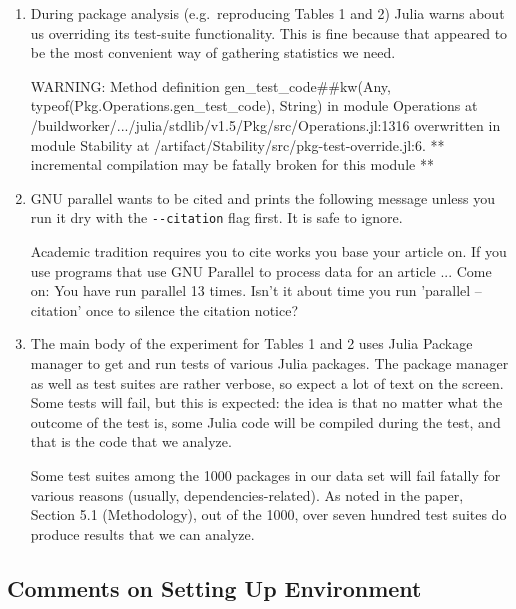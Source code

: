 \documentclass[
]{article}
\begin{document}
\begin{enumerate}
\def\labelenumi{\arabic{enumi}.}
\item
  During package analysis (e.g.~reproducing Tables 1 and 2) Julia warns
  about us overriding its test-suite functionality. This is fine because
  that appeared to be the most convenient way of gathering statistics we
  need.

\begin{verbnobox}[\small]
WARNING: Method definition gen_test_code##kw(Any, typeof(Pkg.Operations.gen_test_code), String)
  in module Operations at /buildworker/.../julia/stdlib/v1.5/Pkg/src/Operations.jl:1316
  overwritten in module Stability at /artifact/Stability/src/pkg-test-override.jl:6.
  ** incremental compilation may be fatally broken for this module **
\end{verbnobox}
\item
  GNU parallel wants to be cited and prints the following message unless
  you run it dry with the \texttt{-\/-citation} flag first. It is safe
  to ignore.

\begin{verbnobox}[\small]
Academic tradition requires you to cite works you base your article on.
If you use programs that use GNU Parallel to process data for an article
...
Come on: You have run parallel 13 times. Isn't it about time 
you run 'parallel --citation' once to silence the citation notice?
\end{verbnobox}
\item
  The main body of the experiment for Tables 1 and 2 uses Julia Package
  manager to get and run tests of various Julia packages. The package
  manager as well as test suites are rather verbose, so expect a lot of
  text on the screen. Some tests will fail, but this is expected: the
  idea is that no matter what the outcome of the test is, some Julia code
  will be compiled during the test, and that is the code that we analyze.

  Some test suites among the 1000 packages in our data set will fail fatally for
  various reasons (usually, dependencies-related). As noted in the
  paper, Section 5.1 (Methodology), out of the 1000, over seven hundred test
  suites do produce results that we can analyze.
\end{enumerate}

\hypertarget{comments-on-setting-up-environment}{%
\subsection{Comments on Setting Up
Environment}\label{comments-on-setting-up-environment}}
\end{document}

